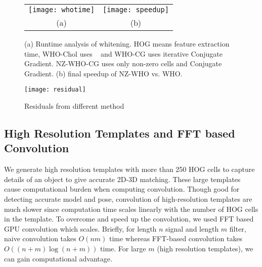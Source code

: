 \begin{figure}[t]
  \begin{center}
  \begin{tabular}{cc}
     \texttt{[image: whotime]} & 
     \texttt{[image: speedup]}\\
     (a) & (b) \\
 \end{tabular}
  \end{center}
  \caption{(a) Runtime analysis of whitening. HOG means feature
    extraction time, WHO-Chol uses ~\cite{Hariharan12} and
    WHO-CG uses iterative Conjugate Gradient. NZ-WHO-CG uses only
    non-zero cells and Conjugate Gradient. (b) final speedup
    of NZ-WHO vs. WHO.}
  \label{fig:whotime}
\end{figure}
%
\begin{figure}[t]
  \centering
  \texttt{[image: residual]}
  \caption{Residuals from different method}
  \label{fig:whoresidual}
\end{figure}


\subsection{High Resolution Templates and FFT based Convolution}
\label{sec:fft} 
We generate high resolution templates with more than 250 HOG cells to capture
details of an object to give accurate 2D-3D matching. These large templates
cause computational burden when computing convolution. Though good for
detecting accurate model and pose, convolution of high-resolution templates are
much slower since computation time scales linearly with the number of HOG
cells in the template. To overcome and speed up the convolution, we used FFT
based GPU convolution \cite{Podlozhnyuk} which scales. Briefly, for length $n$ signal and
length $m$ filter, naive convolution takes $O(nm)$ time whereas FFT-based
convolution takes $O\left( (n + m)\log (n+m) \right)$ time. For large
$m$ (high resolution templates), we can gain computational advantage.
